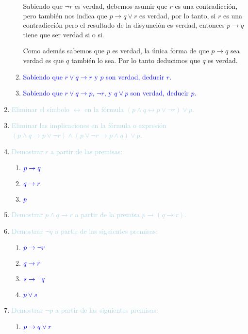 \documentclass[12pt]{article}
\newcommand{\lb}[1]{\textcolor{lightblue}{#1}}
\newcommand{\db}[1]{\textcolor{blue}{#1}}
\begin{document}
\begin{enumerate}[label=\color{red}\textbf{\arabic*)}, leftmargin=*]
\begin{enumerate}[label=\color{red}\alph*)]
            Sabiendo que $\neg r$ es verdad, debemos asumir que $r$ es una contradicción, pero también nos indica que $p\to q\vee r$ es verdad, por lo tanto, si $r$ es una contradicción pero el resultado de la disyunción es verdad, entonces $p\to q$ tiene que ser verdad si o si.
            
            Como además sabemos que $p$ es verdad, la única forma de que $p\to q$ sea verdad es que $q$ también lo sea. Por lo tanto deducimos que $q$ es verdad.
            \item \db{Sabiendo que $r\vee q\to r$ y $p$ son verdad, deducir $r$.}
            
            
            \item \db{Sabiendo que $r\vee q\to p,\,\neg r$, y $q\vee p$ son verdad, deducir $p$.}
      \end{enumerate}
      \item \lb{Eliminar el símbolo $\longleftrightarrow$ en la fórmula $(p\wedge q\leftrightarrow p\vee\neg r)\vee p$.}
      \item \lb{Eliminar las implicaciones en la fórmula o expresión $(p\wedge q\to p\vee\neg r)\wedge(p\vee\neg r\to p\wedge q)\vee p$.}
      \item \lb{Demostrar $r$ a partir de las premisas:}
      \begin{enumerate}[label=\color{red}\alph*)]
            \item $\db{p\to q}$
            \item $\db{q\to r}$
            \item $\db{p}$
      \end{enumerate}
      \item \lb{Demostrar $p\wedge q\to r$ a partir de la premisa $p\to(q\to r)$.}
      \item \lb{Demostrar $\neg q$ a partir de las siguientes premisas:}
      \begin{enumerate}[label=\color{red}\alph*)]
            \item $\db{p\to\neg r}$
            \item $\db{q\to r}$
            \item $\db{s\to\neg q}$
            \item $\db{p\vee s}$
      \end{enumerate}
      \item \lb{Demostrar $\neg p$ a partir de las siguientes premisas:}
      \begin{enumerate}[label=\color{red}\alph*)]
            \item $\db{p\to q\vee r}$

\end{enumerate}
\end{enumerate}
\end{document}
